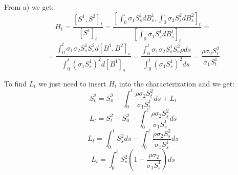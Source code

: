 \documentclass[document.tex]{subfiles}
\begin{document}
From a) we get:
\begin{equation}
H_t = \frac{[S^1, S^2]_t}{[S^1]_t} = \frac{[\int_0^. \sigma_1 S_s^1 d B^1_s, \int_0^. \sigma_2 S_s^2 d B^2_s]_t}{[\int_0^. \sigma_1 S_s^1 d B^1_s]_t} = 
\end{equation}
\begin{equation}
 = \frac{\int_0^t \sigma_1 \sigma_2 S_s^1 S_s^2 d [B^1, B^2]_s}{\int_0^t (\sigma_1 S_s^1)^2 d [B^1]_s} = \frac{\int_0^t \sigma_1 \sigma_2 S_s^1 S_s^2 \rho d s}{\int_0^t (\sigma_1 S_s^1)^2 d s} = \frac{ \rho \sigma_2 S_t^2}{\sigma_1 S_t^1}
\end{equation}

To find $L_t$ we just need to insert $H_t$ into the characterization and we get:
\begin{equation}
S^2_t =  S_0^2 + \int_0^t \frac{ \rho \sigma_2 S_t^2}{\sigma_1 S_t^1} d s + L_t
\end{equation}
\begin{equation}
L_t = S^2_t - S_0^2 - \int_0^t \frac{ \rho \sigma_2 S_s^2}{\sigma_1 S_s^1} d s
\end{equation}
\begin{equation}
L_t = \int_0^t S^2_s d s - \int_0^t \frac{ \rho \sigma_2 S_s^2}{\sigma_1 S_s^1} d s
\end{equation}
\begin{equation}
L_t = \int_0^t S^2_s (1 - \frac{ \rho \sigma_2}{\sigma_1 S_s^1}) d s
\end{equation}
\end{document}
